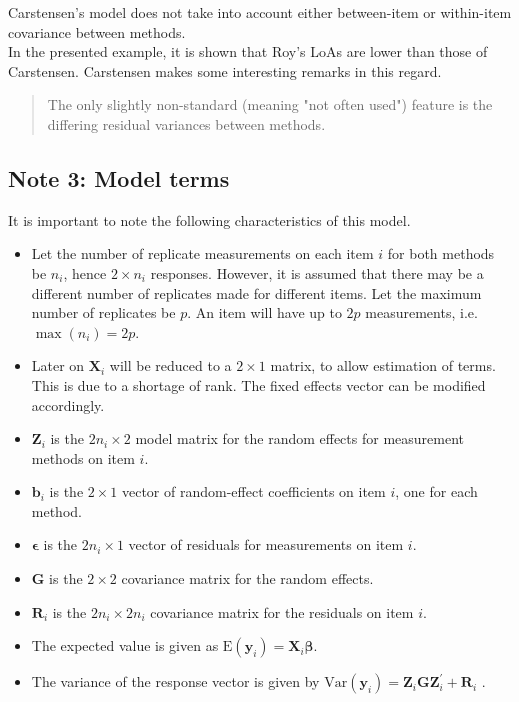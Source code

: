 \documentclass[12pt, a4paper]{report}
\theoremstyle{plain}
\theoremstyle{definition}
\theoremstyle{remark}
\begin{document}
Carstensen's model does not take into account either between-item or within-item covariance between methods.\\


In the presented example, it is shown that Roy's LoAs are lower than those of Carstensen.
Carstensen makes some interesting remarks in this regard.

\begin{quote}
	The only slightly non-standard (meaning "not often used") feature is the differing residual variances between methods.
\end{quote}
\newpage


\subsection{Note 3: Model terms}
It is important to note the following characteristics of this model.
\begin{itemize}
	\item Let the number of replicate measurements on each item $i$ for both methods be $n_i$, hence $2 \times n_i$ responses. However, it is assumed that there may be a different number of replicates made for different items. Let the maximum number of replicates be $p$. An item will have up to $2p$ measurements, i.e. $\max(n_{i}) = 2p$.
	
	
	\item Later on $\boldsymbol{X}_i$ will be reduced to a $2 \times 1$ matrix, to allow estimation of terms. This is due to a shortage of rank. The fixed effects vector can be modified accordingly.
	\item $\boldsymbol{Z}_i$ is the $2n_i \times  2$ model matrix for the random effects for measurement methods on item $i$.
	\item $\boldsymbol{b}_i$ is the $2 \times  1$ vector of random-effect coefficients on item $i$, one for each method.
	\item $\boldsymbol{\epsilon}$  is the $2n_i \times  1$ vector of residuals for measurements on item $i$.
	\item $\boldsymbol{G}$ is the $2 \times  2$ covariance matrix for the random effects.
	\item $\boldsymbol{R}_i$ is the $2n_i \times  2n_i$ covariance matrix for the residuals on item $i$.
	\item The expected value is given as $\mbox{E}(\boldsymbol{y}_i) = \boldsymbol{X}_i\boldsymbol{\beta}.$ \citep{hamlett}
	\item The variance of the response vector is given by $\mbox{Var}(\boldsymbol{y}_i)  = \boldsymbol{Z}_i \boldsymbol{G} \boldsymbol{Z}_i^{\prime} + \boldsymbol{R}_i$ \citep{hamlett}.
\end{itemize}
\newpage
\newpage
\end{document}
